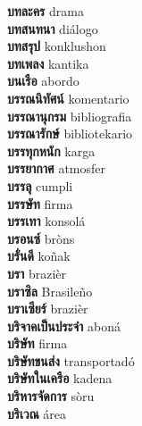 \textbf{ บทละคร  } drama \\
\textbf{ บทสนทนา  } diálogo \\
\textbf{ บทสรุป  } konklushon \\
\textbf{ บทเพลง  } kantika \\
\textbf{ บนเรือ  } abordo \\
\textbf{ บรรณนิทัศน์  } komentario \\
\textbf{ บรรณานุกรม  } bibliografia \\
\textbf{ บรรณารักษ์  } bibliotekario \\
\textbf{ บรรทุกหนัก  } karga \\
\textbf{ บรรยากาศ  } atmosfer \\
\textbf{ บรรลุ  } cumpli \\
\textbf{ บรรษัท  } firma \\
\textbf{ บรรเทา  } konsolá \\
\textbf{ บรอนซ์  } bròns \\
\textbf{ บรั่นดี  } koñak \\
\textbf{ บรา  } brazièr \\
\textbf{ บราซิล  } Brasileño \\
\textbf{ บราเซียร์  } brazièr \\
\textbf{ บริจาคเป็นประจำ  } aboná \\
\textbf{ บริษัท  } firma \\
\textbf{ บริษัทขนส่ง  } transportadó \\
\textbf{ บริษัทในเครือ  } kadena \\
\textbf{ บริหารจัดการ  } sòru \\
\textbf{ บริเวณ  } área \\
